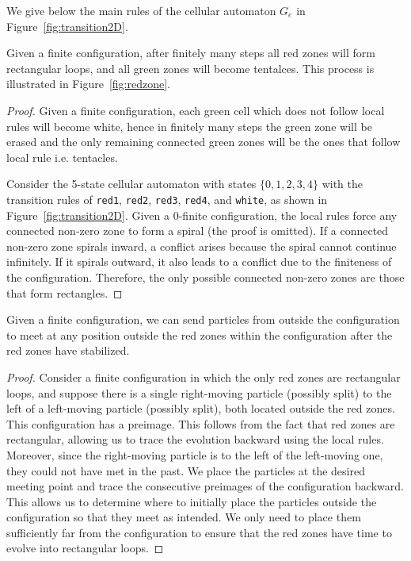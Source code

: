 \documentclass{llncs}
\begin{document}
We give below the main rules of the cellular automaton $G_e$ in Figure~\ref{fig:transition2D}.




\begin{lemma}\label{lem:redzone}
Given a finite configuration, after finitely many steps all red zones will form rectangular loops, and all green zones will become tentalces. This process is illustrated in Figure~\ref{fig:redzone}.
\end{lemma}
\begin{proof}
Given a finite configuration, each green cell which does not follow local rules will become white, hence in finitely many steps the green zone will be erased and the only remaining connected green zones will be the ones that follow local rule i.e. tentacles. 

Consider the 5-state cellular automaton with states \(\{0, 1, 2, 3, 4\}\) with the transition rules of \texttt{red1}, \texttt{red2}, \texttt{red3}, \texttt{red4}, and \texttt{white}, as shown in Figure~\ref{fig:transition2D}. Given a 0-finite configuration, the local rules force any connected non-zero zone to form a spiral (the proof is omitted). If a connected non-zero zone spirals inward, a conflict arises because the spiral cannot continue infinitely. If it spirals outward, it also leads to a conflict due to the finiteness of the configuration. Therefore, the only possible connected non-zero zones are those that form rectangles.
\end{proof}



\begin{lemma}
	Given a finite configuration, we can send particles from outside the configuration to meet at any position outside the red zones within the configuration after the red zones have stabilized.
\end{lemma}

\begin{proof}
		Consider a finite configuration in which the only red zones are rectangular loops, and suppose there is a single right-moving particle (possibly split) to the left of a left-moving particle (possibly split), both located outside the red zones. This configuration has a preimage. This follows from the fact that red zones are rectangular, allowing us to trace the evolution backward using the local rules. Moreover, since the right-moving particle is to the left of the left-moving one, they could not have met in the past. 
We place the particles at the desired meeting point and trace the consecutive preimages of the configuration backward. This allows us to determine where to initially place the particles outside the configuration so that they meet as intended. We only need to place them sufficiently far from the configuration to ensure that the red zones have time to evolve into rectangular loops.
\end{proof}
\end{document}
